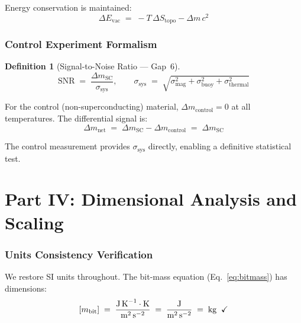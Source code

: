 \documentclass[11pt,a4paper]{article}
\newtheorem{definition}{Definition}[section]
\theoremstyle{remark}
\begin{document}
Energy conservation is maintained:
\begin{equation}\label{eq:firstlaw}
    \Delta E_{\text{vac}} \;=\; -T\,\Delta S_{\text{topo}} - \Delta m\, c^2
\end{equation}

\section{Control Experiment Formalism}
\label{sec:control}

\begin{definition}[Signal-to-Noise Ratio --- Gap~6]
\begin{equation}\label{eq:snr}
    \text{SNR} \;=\; \frac{\Delta m_{\text{SC}}}{\sigma_{\text{sys}}},
    \qquad
    \sigma_{\text{sys}} \;=\; \sqrt{\sigma_{\text{mag}}^2 + \sigma_{\text{buoy}}^2
        + \sigma_{\text{thermal}}^2}
\end{equation}
\end{definition}

For the control (non-superconducting) material, $\Delta m_{\text{control}} = 0$ at all temperatures.  The differential signal is:
\begin{equation}\label{eq:differential}
    \Delta m_{\text{net}} \;=\; \Delta m_{\text{SC}} - \Delta m_{\text{control}}
        \;=\; \Delta m_{\text{SC}}
\end{equation}

The control measurement provides $\sigma_{\text{sys}}$ directly, enabling a definitive statistical test.

\part{Part IV: Dimensional Analysis and Scaling}
\label{part:scaling}

\section{Units Consistency Verification}
\label{sec:units}

We restore SI units throughout.  The bit-mass equation (Eq.~\eqref{eq:bitmass}) has dimensions:
\[
    [m_{\text{bit}}] \;=\; \frac{\text{J\,K}^{-1}\cdot\text{K}}
        {\text{m}^2\,\text{s}^{-2}}
    \;=\; \frac{\text{J}}{\text{m}^2\,\text{s}^{-2}}
    \;=\; \text{kg} \;\;\checkmark
\]
\end{document}
